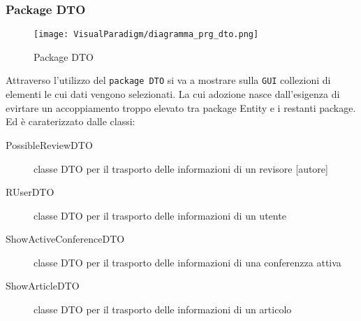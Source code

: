 \subsubsection{Package DTO}

\label{sec:package dto}
\begin{figure}[ht]
  \centering
  \texttt{[image: VisualParadigm/diagramma\_prg\_dto.png]}
  \caption{Package DTO}
  \label{fig:Package DTO}
\end{figure}

Attraverso l'utilizzo del \texttt{package DTO} si va a mostrare sulla \texttt{GUI} collezioni di elementi le cui dati vengono selezionati. La cui adozione nasce dall'esigenza di evirtare un accoppiamento troppo elevato tra package Entity e i restanti package. Ed è caraterizzato dalle classi:
\begin{description}
\item[PossibleReviewDTO] classe DTO per il trasporto delle informazioni di un revisore [autore]
\item[RUserDTO] classe DTO per il trasporto delle informazioni di un utente
\item[ShowActiveConferenceDTO] classe DTO per il trasporto delle informazioni di una conferenzza attiva
\item[ShowArticleDTO] classe DTO per il trasporto delle informazioni di un articolo
\end{description}
